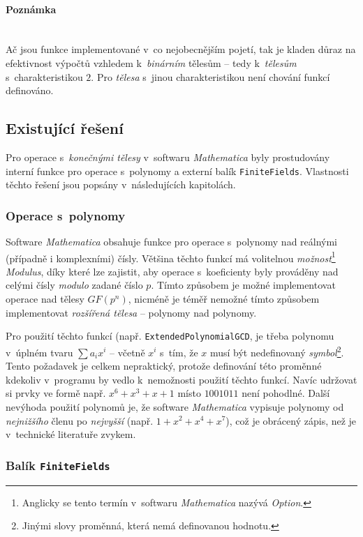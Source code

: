 \documentclass[thesis=M,czech,hidelinks]{FITthesis}[2012/06/26]
\newcommand{\0}{{\textcolor[gray]{0.80}{0}}}
\begin{document}
\paragraph{Poznámka} \hfil \\
Ač jsou funkce implementované v~co nejobecnějším pojetí,
tak je kladen důraz na efektivnost výpočtů vzhledem k~\emph{binárním} tělesům --
tedy k~\emph{tělesům} s~charakteristikou $2$. Pro \emph{tělesa} s~jinou
charakteristikou není chování funkcí definováno.

\subsection{Existující řešení}
Pro operace s~\emph{konečnými tělesy} v~softwaru \emph{Mathematica} byly
prostudovány interní funkce pro operace s~polynomy a externí balík
\texttt{FiniteFields}. Vlastnosti těchto řešení jsou popsány v~následujících
kapitolách.

\subsubsection{Operace s~polynomy}
Software \emph{Mathematica} obsahuje funkce pro operace s~polynomy nad reálnými
(případně i komplexními) čísly. Většina těchto funkcí má volitelnou
\emph{možnost}\footnote{
    Anglicky se tento termín v~softwaru \emph{Mathematica}
    nazývá \emph{Option}.
} \emph{Modulus}, díky které lze zajistit, aby operace s~koeficienty byly
prováděny nad celými čísly \emph{modulo} zadané číslo $p$. Tímto způsobem je
možné implementovat operace nad tělesy $GF(p^n)$, nicméně je téměř nemožné tímto
způsobem implementovat \emph{rozšířená tělesa} -- polynomy nad polynomy.

Pro použití těchto funkcí (např. \texttt{ExtendedPolynomialGCD}, je třeba
polynomu v~úplném tvaru $\sum a_i x^i$ -- včetně $x^i$ s~tím, že $x$ musí být
nedefinovaný \emph{symbol}\footnote{
    Jinými slovy proměnná, která nemá definovanou hodnotu.
}. Tento požadavek je celkem nepraktický, protože definování této proměnné
kdekoliv v~programu by vedlo k~nemožnosti použití těchto funkcí. Navíc udržovat
si prvky ve formě např. $x^6 + x^3 + x + 1$ místo $1001011$ není pohodlné.
Další nevýhoda použití polynomů je, že software \emph{Mathematica} vypisuje
polynomy od \emph{nejnižšího} členu po \emph{nejvyšší} (např. $1+x^2+x^4+x^7$),
což je obrácený zápis, než je v~technické literatuře zvykem.

\subsubsection{Balík \texttt{FiniteFields}}
\end{document}
